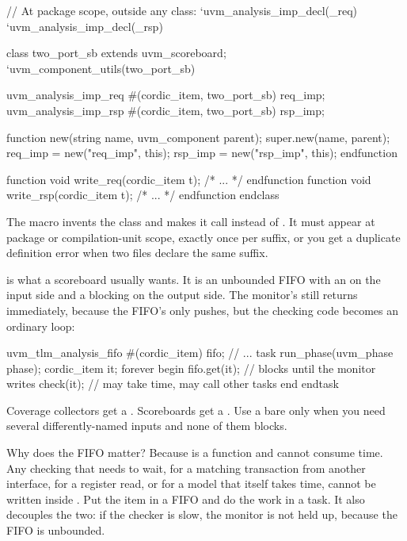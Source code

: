 \begin{uvmcode}[caption={Two analysis inputs on one scoreboard},label={lst:uvm:imp-decl}]
// At package scope, outside any class:
`uvm_analysis_imp_decl(_req)
`uvm_analysis_imp_decl(_rsp)

class two_port_sb extends uvm_scoreboard;
  `uvm_component_utils(two_port_sb)

  uvm_analysis_imp_req #(cordic_item, two_port_sb) req_imp;
  uvm_analysis_imp_rsp #(cordic_item, two_port_sb) rsp_imp;

  function new(string name, uvm_component parent);
    super.new(name, parent);
    req_imp = new("req_imp", this);
    rsp_imp = new("rsp_imp", this);
  endfunction

  function void write_req(cordic_item t);  /* ... */ endfunction
  function void write_rsp(cordic_item t);  /* ... */ endfunction
endclass
\end{uvmcode}

The macro invents the class  and makes it call
 instead of . It must appear at package or
compilation-unit scope, exactly once per suffix, or you get a duplicate
definition error when two files declare the same suffix.

%
\textbf{} is what a scoreboard usually
wants. It is an unbounded FIFO with an  on the input
side and a blocking  on the output side. The monitor's
 still returns immediately, because the FIFO's 
only pushes, but the checking code becomes an ordinary 
loop:

\begin{uvmcode}
uvm_tlm_analysis_fifo #(cordic_item) fifo;
// ...
task run_phase(uvm_phase phase);
  cordic_item it;
  forever begin
    fifo.get(it);        // blocks until the monitor writes
    check(it);           // may take time, may call other tasks
  end
endtask
\end{uvmcode}

\begin{ruleofthumb}
Coverage collectors get a . Scoreboards get a
. Use a bare  only
when you need several differently-named inputs and none of them blocks.
\end{ruleofthumb}

Why does the FIFO matter? Because  is a function and cannot
consume time. Any checking that needs to wait, for a matching transaction
from another interface, for a register read, or for a model that itself takes
time, cannot be written inside . Put the item in a FIFO and
do the work in a task. It also decouples the two: if the checker is slow, the
monitor is not held up, because the FIFO is unbounded.

